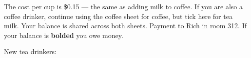 \documentclass{article}
\newcommand{\expandUP}[1]{\MakeUppercase{\expand{#1}}}
\begin{document}

The cost per cup is \$0.15 --- the same as adding milk to
coffee.
%
If you are also a coffee drinker, continue using the coffee sheet for
coffee, but tick here for tea milk.  Your balance is shared across
both sheets.
%
Payment to Rich in room 312.  If your balance is \textbf{bolded} you
owe money.

\vspace{8pt}

\begin{center}
\setlength{\aboverulesep}{0pt}
\setlength{\belowrulesep}{0pt}
\setlength{\extrarowheight}{.75ex}

\end{center}

\vspace{8pt}
New tea drinkers:
\begin{center}
\setlength{\aboverulesep}{0pt}
\setlength{\belowrulesep}{0pt}
\setlength{\extrarowheight}{.75ex}

\end{center}
\end{document}
